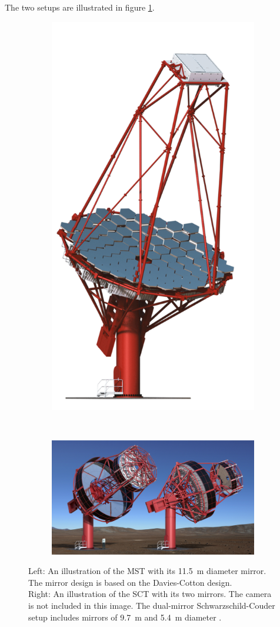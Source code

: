 The two setups are illustrated in figure \ref{fig:mst_comp}.

\begin{figure}
    \centering
    \begin{subfigure}[t]{0.35\textwidth}
        \centering
		\captionsetup{width=0.9\linewidth}
		\includegraphics[width=.45\textwidth]{images/MST-1.png}
    \end{subfigure}%
	~
    \begin{subfigure}[t]{0.55\textwidth}
        \centering
		\captionsetup{width=0.9\linewidth}
		\includegraphics[width=.9\textwidth]{images/SCT.png}
    \end{subfigure}
    \caption{
	Left: An illustration of the MST with its
		\SI{11.5}{\meter} diameter mirror.
		The mirror design is based on the Davies-Cotton design. \\
	Right: An illustration of the SCT with its
		two mirrors. The camera is not included in this image.
		The dual-mirror Schwarzschild-Couder setup includes mirrors of
		\SI{9.7}{\meter} and \SI{5.4}{\meter} diameter \cite{cta_web}.}
	\label{fig:mst_comp}
\end{figure}


